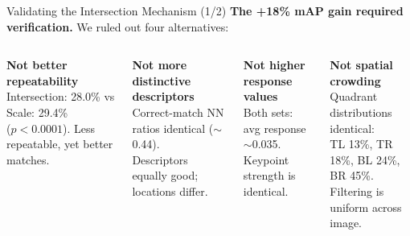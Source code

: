 \documentclass[aspectratio=169, 12pt]{beamer}
\begin{document}
\begin{frame}{Validating the Intersection Mechanism (1/2)}
  \textbf{The +18\% mAP gain required verification.} We ruled out four alternatives:
  \begin{columns}[T]
    \textbf{\color{degrade} Not better repeatability}\\
    {\small Intersection: 28.0\% vs Scale: 29.4\%\\($p < 0.0001$). Less repeatable, yet better matches.}
    \vspace{0.6em}

    \textbf{\color{degrade} Not more distinctive descriptors}\\
    {\small Correct-match NN ratios identical ($\sim$0.44).\\Descriptors equally good; locations differ.}

    \textbf{\color{degrade} Not higher response values}\\
    {\small Both sets: avg response $\sim$0.035.\\Keypoint strength is identical.}
    \vspace{0.6em}

    \textbf{\color{degrade} Not spatial crowding}\\
    {\small Quadrant distributions identical:\\TL 13\%, TR 18\%, BL 24\%, BR 45\%.\\Filtering is uniform across image.}
  \end{columns}
\end{frame}
\end{document}
